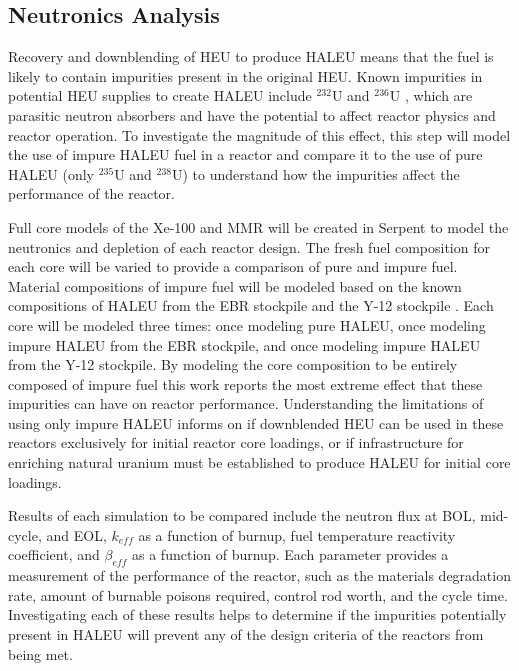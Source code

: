 \subsection{Neutronics Analysis}
Recovery and downblending of \gls{HEU} to produce \gls{HALEU} means that 
the fuel is likely to contain impurities present in the original
\gls{HEU}. Known impurities in potential \gls{HEU}
supplies to create \gls{HALEU} include $^{232}$U and $^{236}$U
\cite{vaden_isotopic_2018,nelson_foreign_2010},  
which are parasitic neutron absorbers and have the potential to affect 
reactor physics and reactor operation. To investigate the magnitude of this 
effect, this step will model the use of 
impure \gls{HALEU} fuel in a reactor and compare it to the use of pure 
\gls{HALEU} (only $^{235}$U and $^{238}$U)
to understand how the impurities affect the performance of the reactor. 

Full core models of the Xe-100 and \gls{MMR} will be created in Serpent 
\cite{leppanen_serpent_2014} to model the neutronics and depletion of 
each reactor 
design. The fresh fuel composition for each core will be varied to provide 
a comparison of pure and impure fuel.
Material compositions of impure fuel will be modeled based on the 
known compositions of \gls{HALEU} from the \gls{EBR} stockpile 
\cite{vaden_isotopic_2018} and the Y-12 stockpile \cite{nelson_foreign_2010}.
Each core will be modeled three times: once modeling pure \gls{HALEU}, 
once modeling impure \gls{HALEU} from the \gls{EBR} stockpile, and once 
modeling impure \gls{HALEU} from the Y-12 stockpile.
By modeling the core composition to be entirely composed of impure fuel 
this work reports the most extreme effect that these impurities can 
have on reactor performance. Understanding the limitations of using only 
impure \gls{HALEU} informs on if downblended \gls{HEU} can be used in 
these reactors exclusively for initial reactor core loadings, or if 
infrastructure for enriching natural uranium must be established to 
produce \gls{HALEU} for initial core loadings. 

Results of each simulation to be compared include the neutron flux at 
\gls{BOL}, mid-cycle, and \gls{EOL}, $k_{eff}$ as a function of burnup, 
fuel temperature reactivity coefficient, and 
$\beta_{eff}$ as a function of burnup. Each parameter provides a 
measurement of the performance of 
the reactor, such as the materials degradation rate, amount of burnable 
poisons required, control rod worth, and the cycle time. Investigating 
each of these results helps to determine if the impurities potentially 
present in \gls{HALEU} will prevent any of the design criteria of the 
reactors from being met. 